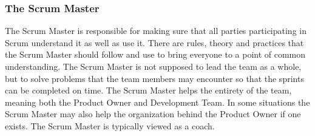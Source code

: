 \subsubsection{The Scrum Master}

The Scrum Master is responsible for making sure that all parties participating in Scrum
understand it as well as use it.  There are rules, theory and practices
that the Scrum Master should follow and use to bring everyone to a point of common
understanding\cite{scrumguide11}. The Scrum Master is not supposed to lead
the team as a whole, but to solve problems that the team members may encounter so that the
sprints can be completed on time. The Scrum Master helps the entirety of
the team, meaning both the Product Owner and Development Team\cite{scrumguide11}. In some
situations the Scrum Master may also help the organization behind the Product
Owner if one exists. The Scrum Master is typically viewed as a
coach\cite{scrumguide11}.
